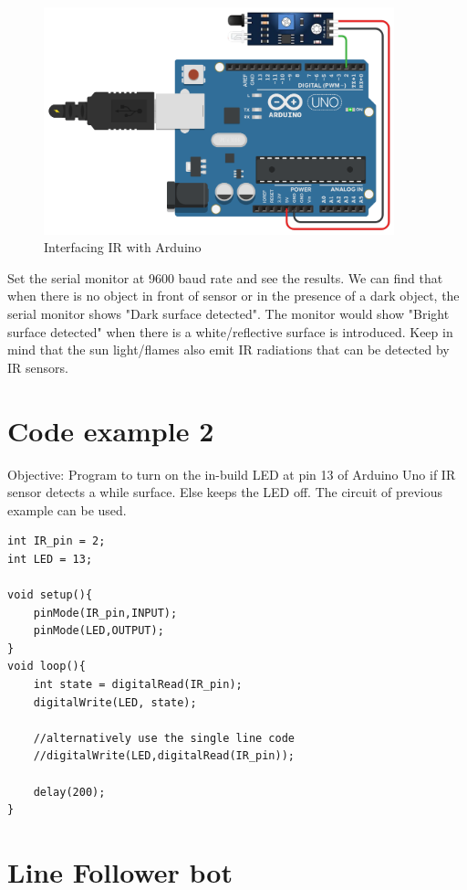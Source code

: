 \begin{figure}[h!]	
	\centering
	\includegraphics[width=4in]{Images/IR Sensor/circuit1.png}
	\caption{Interfacing \ac{IR} with Arduino}
\end{figure}

\par Set the serial monitor at 9600 baud rate and see the results. We can find that when there is no object in front of sensor or in the presence of a dark object, the serial monitor shows "Dark surface detected". The monitor would show "Bright surface detected" when there is a white/reflective surface is introduced. Keep in mind that the sun light/flames also emit \ac{IR} radiations that can be detected by \ac{IR} sensors.

\section{\textbf{Code example 2}}
Objective: Program to turn on the in-build LED at pin 13 of Arduino Uno if \ac{IR} sensor detects a while surface. Else keeps the LED off. The circuit of previous example can be used.

\begin{lstlisting}[style=CStyle]
int IR_pin = 2;
int LED = 13;

void setup(){
    pinMode(IR_pin,INPUT);
    pinMode(LED,OUTPUT);
}
void loop(){
    int state = digitalRead(IR_pin);
    digitalWrite(LED, state);
    
    //alternatively use the single line code
    //digitalWrite(LED,digitalRead(IR_pin));
    
    delay(200);
}
\end{lstlisting}


\section{Line Follower bot}

